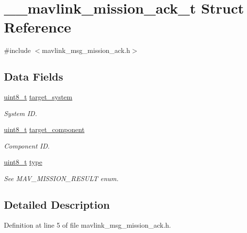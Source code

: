 \hypertarget{struct____mavlink__mission__ack__t}{\section{\-\_\-\-\_\-mavlink\-\_\-mission\-\_\-ack\-\_\-t Struct Reference}
\label{struct____mavlink__mission__ack__t}
}


{\ttfamily \#include $<$mavlink\-\_\-msg\-\_\-mission\-\_\-ack.\-h$>$}

\subsection*{Data Fields}
\begin{DoxyCompactItemize}
\item 
\hyperlink{stdint_8h_aba7bc1797add20fe3efdf37ced1182c5}{uint8\-\_\-t} \hyperlink{struct____mavlink__mission__ack__t_ab8ef2eb9bff8975de92406b94c18d907}{target\-\_\-system}
\begin{DoxyCompactList}\small\item\em System I\-D. \end{DoxyCompactList}\item 
\hyperlink{stdint_8h_aba7bc1797add20fe3efdf37ced1182c5}{uint8\-\_\-t} \hyperlink{struct____mavlink__mission__ack__t_ab254af31fbc3e92ab8cffcea8bd78fba}{target\-\_\-component}
\begin{DoxyCompactList}\small\item\em Component I\-D. \end{DoxyCompactList}\item 
\hyperlink{stdint_8h_aba7bc1797add20fe3efdf37ced1182c5}{uint8\-\_\-t} \hyperlink{struct____mavlink__mission__ack__t_ad05f998d3b1bea0480eb25dcb82e0c92}{type}
\begin{DoxyCompactList}\small\item\em See M\-A\-V\-\_\-\-M\-I\-S\-S\-I\-O\-N\-\_\-\-R\-E\-S\-U\-L\-T enum. \end{DoxyCompactList}\end{DoxyCompactItemize}


\subsection{Detailed Description}


Definition at line 5 of file mavlink\-\_\-msg\-\_\-mission\-\_\-ack.\-h.



